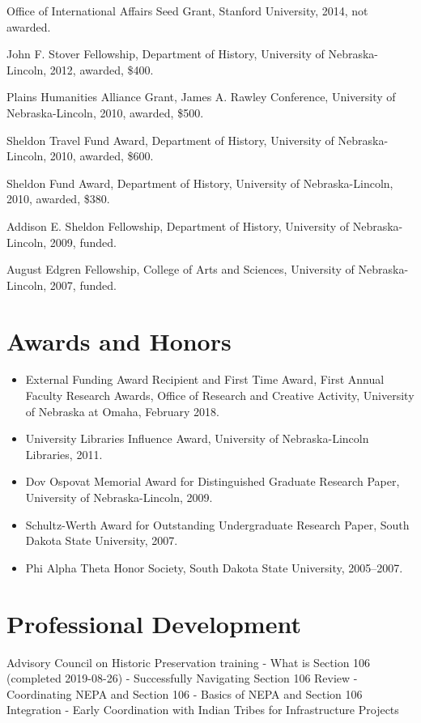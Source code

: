 Office of International Affairs Seed Grant, Stanford University, 2014,
not awarded.

John F. Stover Fellowship, Department of History, University of
Nebraska-Lincoln, 2012, awarded, \$400.

Plains Humanities Alliance Grant, James A. Rawley Conference, University
of Nebraska-Lincoln, 2010, awarded, \$500.

Sheldon Travel Fund Award, Department of History, University of
Nebraska-Lincoln, 2010, awarded, \$600.

Sheldon Fund Award, Department of History, University of
Nebraska-Lincoln, 2010, awarded, \$380.

Addison E. Sheldon Fellowship, Department of History, University of
Nebraska-Lincoln, 2009, funded.

August Edgren Fellowship, College of Arts and Sciences, University of
Nebraska-Lincoln, 2007, funded.

\section{Awards and Honors}\label{awards-and-honors}

\begin{itemize}
\tightlist
\item
  External Funding Award Recipient and First Time Award, First Annual
  Faculty Research Awards, Office of Research and Creative Activity,
  University of Nebraska at Omaha, February 2018.
\item
  University Libraries Influence Award, University of Nebraska-Lincoln
  Libraries, 2011.
\item
  Dov Ospovat Memorial Award for Distinguished Graduate Research Paper,
  University of Nebraska-Lincoln, 2009.
\item
  Schultz-Werth Award for Outstanding Undergraduate Research Paper,
  South Dakota State University, 2007.
\item
  Phi Alpha Theta Honor Society, South Dakota State University,
  2005--2007.
\end{itemize}

\section{Professional Development}\label{professional-development}

Advisory Council on Historic Preservation training - What is Section 106
(completed 2019-08-26) - Successfully Navigating Section 106 Review -
Coordinating NEPA and Section 106 - Basics of NEPA and Section 106
Integration - Early Coordination with Indian Tribes for Infrastructure
Projects

